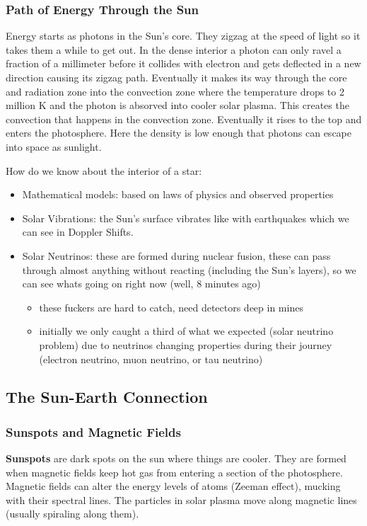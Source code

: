 \documentclass[12pt]{article}
\begin{document}
\subsubsection{Path of Energy Through the Sun}
Energy starts as photons in the Sun's core. They zigzag at the speed of light so it takes them a while to get out. In the dense interior a photon can only ravel a fraction of a millimeter before it collides with electron and gets deflected in a new direction causing its zigzag path. Eventually it makes its way through the core and radiation zone into the convection zone where the temperature drops to 2 million K and the photon is absorved into cooler solar plasma. This creates the convection that happens in the convection zone. Eventually it rises to the top and enters the photosphere. Here the density is low enough that photons can escape into space as sunlight.

How do we know about the interior of a star:
\begin{itemize}
    \item Mathematical models: based on laws of physics and observed properties
    \item Solar Vibrations: the Sun's surface vibrates like with earthquakes which we can see in Doppler Shifts.
    \item Solar Neutrinos: these are formed during nuclear fusion, these can pass through almost anything without reacting (including the Sun's layers), so we can see whats going on right now (well, 8 minutes ago)
    \begin{itemize}
        \item these fuckers are hard to catch, need detectors deep in mines
        \item initially we only caught a third of what we expected (solar neutrino problem) due to neutrinos changing properties during their journey (electron neutrino, muon neutrino, or tau neutrino)
    \end{itemize}
\end{itemize}

\subsection{The Sun-Earth Connection}
\subsubsection{Sunspots and Magnetic Fields}
\textbf{Sunspots} are dark spots on the sun where things are cooler. They are formed when magnetic fields keep hot gas from entering a section of the photosphere. Magnetic fields can alter the energy levels of atoms (Zeeman effect), mucking with their spectral lines. The particles in solar plasma move along magnetic lines (usually spiraling along them).
\end{document}

